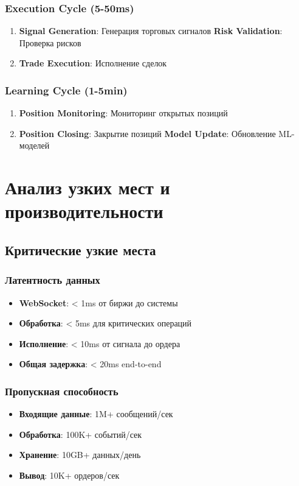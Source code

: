 \documentclass[12pt,a4paper]{article}
\begin{document}
\subsubsection{Execution Cycle (5-50ms)}
\begin{enumerate}
    \item \textbf{Signal Generation}: Генерация торговых сигналов
    \textbf{Risk Validation}: Проверка рисков
    \item \textbf{Trade Execution}: Исполнение сделок
\end{enumerate}

\subsubsection{Learning Cycle (1-5min)}
\begin{enumerate}
    \item \textbf{Position Monitoring}: Мониторинг открытых позиций
    \item \textbf{Position Closing}: Закрытие позиций
    \textbf{Model Update}: Обновление ML-моделей
\end{enumerate}

\section{Анализ узких мест и производительности}

\subsection{Критические узкие места}

\subsubsection{Латентность данных}
\begin{itemize}
    \item \textbf{WebSocket}: < 1ms от биржи до системы
    \item \textbf{Обработка}: < 5ms для критических операций
    \item \textbf{Исполнение}: < 10ms от сигнала до ордера
    \item \textbf{Общая задержка}: < 20ms end-to-end
\end{itemize}

\subsubsection{Пропускная способность}
\begin{itemize}
    \item \textbf{Входящие данные}: 1M+ сообщений/сек
    \item \textbf{Обработка}: 100K+ событий/сек
    \item \textbf{Хранение}: 10GB+ данных/день
    \item \textbf{Вывод}: 10K+ ордеров/сек
\end{itemize}
\end{document}
